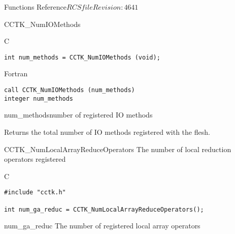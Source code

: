\begin{cactuspart}{ Functions Reference}{$RCSfile$}{$Revision: 4641 $}
\begin{FunctionDescription}{CCTK\_NumIOMethods}
\begin{SynopsisSection}
\begin{Synopsis}{C}
\begin{verbatim}
int num_methods = CCTK_NumIOMethods (void);
\end{verbatim}
\end{Synopsis}
\begin{Synopsis}{Fortran}
\begin{verbatim}
call CCTK_NumIOMethods (num_methods)
integer num_methods
\end{verbatim}
\end{Synopsis}
\end{SynopsisSection}

\begin{ParameterSection}
\begin{Parameter}{num\_methods}number of registered IO methods\end{Parameter}
\end{ParameterSection}

\begin{Discussion}
Returns the total number of IO methods registered with the flesh.
\end{Discussion}
\end{FunctionDescription}



\begin{FunctionDescription}{CCTK\_NumLocalArrayReduceOperators}
\label{CCTK-NumLocalArrayReduceOperators}
The number of local reduction operators registered

\begin{SynopsisSection}
\begin{Synopsis}{C}
\begin{verbatim}
#include "cctk.h"

int num_ga_reduc = CCTK_NumLocalArrayReduceOperators();
\end{verbatim}
\end{Synopsis}
\end{SynopsisSection}

\begin{ResultSection}
\begin{Result}{num\_ga\_reduc}
The number of registered local array operators
\end{Result}
\end{ResultSection}



\end{FunctionDescription}
\end{cactuspart}

